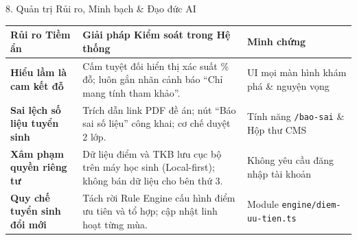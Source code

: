 \documentclass[aspectratio=169, 10pt]{beamer}
\begin{document}
\begin{frame}{8. Quản trị Rủi ro, Minh bạch \& Đạo đức AI}
\begin{table}[]
\small
\centering
\begin{tabular}{p{4.2cm} p{5.5cm} p{4.2cm}}
\toprule
\textbf{Rủi ro Tiềm ẩn} & \textbf{Giải pháp Kiểm soát trong Hệ thống} & \textbf{Minh chứng} \\
\midrule
\textbf{Hiểu lầm là cam kết đỗ} & Cấm tuyệt đối hiển thị xác suất \% đỗ; luôn gắn nhãn cảnh báo ``Chỉ mang tính tham khảo''. & UI mọi màn hình khám phá \& nguyện vọng \\
\midrule
\textbf{Sai lệch số liệu tuyển sinh} & Trích dẫn link PDF đề án; nút ``Báo sai số liệu'' công khai; cơ chế duyệt 2 lớp. & Tính năng \texttt{/bao-sai} \& Hộp thư CMS \\
\midrule
\textbf{Xâm phạm quyền riêng tư} & Dữ liệu điểm và TKB lưu cục bộ trên máy học sinh (Local-first); không bán dữ liệu cho bên thứ 3. & Không yêu cầu đăng nhập tài khoản \\
\midrule
\textbf{Quy chế tuyển sinh đổi mới} & Tách rời Rule Engine cấu hình điểm ưu tiên và tổ hợp; cập nhật linh hoạt từng mùa. & Module \texttt{engine/diem-uu-tien.ts} \\
\bottomrule
\end{tabular}
\end{table}
\end{frame}
\end{document}
